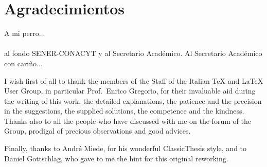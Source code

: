 
\begingroup
\let\clearpage\relax
\let\cleardoublepage\relax
\let\cleardoublepage\relax

\chapter*{Agradecimientos}

A mi perro... \\ \\ al fondo SENER-CONACYT y al Secretario Académico.
Al Secretario Académico con cariño...

I wish first of all to thank the members of the Staff of the Italian \TeX{} and \LaTeX{} User Group, in particular Prof.~Enrico Gregorio, for their invaluable aid during the writing of this work, the detailed explanations, the patience and the precision in the suggestions, the supplied solutions, the competence and the kindness. Thanks also to all the people who have discussed with me on the forum of the Group, prodigal of precious observations and good advices.

Finally, thanks to Andr\'e Miede, for his wonderful ClassicThesis style, and to Daniel Gottschlag, who gave to me the hint for this original reworking.


\endgroup



